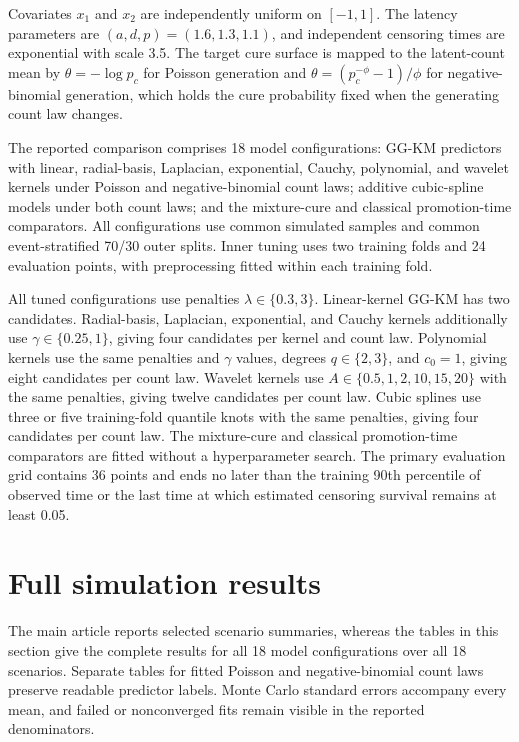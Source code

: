 \documentclass[11pt]{article}
\begin{document}
Covariates $x_1$ and $x_2$ are independently uniform on $[-1,1]$. The latency parameters are $(a,d,p)=(1.6,1.3,1.1)$, and independent censoring times are exponential with scale 3.5. The target cure surface is mapped to the latent-count mean by $\theta=-\log p_c$ for Poisson generation and $\theta=(p_c^{-\phi}-1)/\phi$ for negative-binomial generation, which holds the cure probability fixed when the generating count law changes.

The reported comparison comprises 18 model configurations: GG-KM predictors with linear, radial-basis, Laplacian, exponential, Cauchy, polynomial, and wavelet kernels under Poisson and negative-binomial count laws; additive cubic-spline models under both count laws; and the mixture-cure and classical promotion-time comparators. All configurations use common simulated samples and common event-stratified 70/30 outer splits. Inner tuning uses two training folds and 24 evaluation points, with preprocessing fitted within each training fold.

All tuned configurations use penalties $\lambda\in\{0.3,3\}$. Linear-kernel GG-KM has two candidates. Radial-basis, Laplacian, exponential, and Cauchy kernels additionally use $\gamma\in\{0.25,1\}$, giving four candidates per kernel and count law. Polynomial kernels use the same penalties and $\gamma$ values, degrees $q\in\{2,3\}$, and $c_0=1$, giving eight candidates per count law. Wavelet kernels use $A\in\{0.5,1,2,10,15,20\}$ with the same penalties, giving twelve candidates per count law. Cubic splines use three or five training-fold quantile knots with the same penalties, giving four candidates per count law. The mixture-cure and classical promotion-time comparators are fitted without a hyperparameter search. The primary evaluation grid contains 36 points and ends no later than the training 90th percentile of observed time or the last time at which estimated censoring survival remains at least 0.05.

\section{Full simulation results}\label{sec:supp-simulation-results}

The main article reports selected scenario summaries, whereas
the tables in this section give the complete results for all 18 model configurations over all 18 scenarios. Separate tables for fitted
Poisson and negative-binomial count laws preserve readable
predictor labels. Monte Carlo standard errors accompany
every mean, and failed or nonconverged fits remain visible
in the reported denominators.
\end{document}
